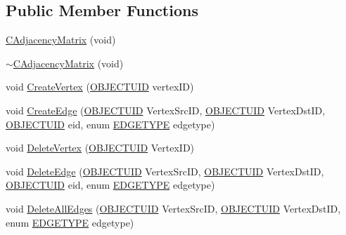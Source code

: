 \subsection*{Public Member Functions}
\begin{DoxyCompactItemize}
\item 
\hyperlink{class_n_m_1_1_o_d_b_1_1_c_adjacency_matrix_a0e8396d3b62701ef050f7b43819dc217}{C\+Adjacency\+Matrix} (void)
\item 
\hyperlink{class_n_m_1_1_o_d_b_1_1_c_adjacency_matrix_a526eb801477d33094e800614b1e4b4a3}{$\sim$\+C\+Adjacency\+Matrix} (void)
\item 
void \hyperlink{class_n_m_1_1_o_d_b_1_1_c_adjacency_matrix_aed4e1441f1acb61060b5076a766154fd}{Create\+Vertex} (\hyperlink{namespace_n_m_1_1_o_d_b_a262b64fab56baaa96e18bac4ada88265}{O\+B\+J\+E\+C\+T\+U\+I\+D} vertex\+I\+D)
\item 
void \hyperlink{class_n_m_1_1_o_d_b_1_1_c_adjacency_matrix_ada545d95afc704db45d8de771ce90f46}{Create\+Edge} (\hyperlink{namespace_n_m_1_1_o_d_b_a262b64fab56baaa96e18bac4ada88265}{O\+B\+J\+E\+C\+T\+U\+I\+D} Vertex\+Src\+I\+D, \hyperlink{namespace_n_m_1_1_o_d_b_a262b64fab56baaa96e18bac4ada88265}{O\+B\+J\+E\+C\+T\+U\+I\+D} Vertex\+Dst\+I\+D, \hyperlink{namespace_n_m_1_1_o_d_b_a262b64fab56baaa96e18bac4ada88265}{O\+B\+J\+E\+C\+T\+U\+I\+D} eid, enum \hyperlink{class_n_m_1_1_o_d_b_1_1_c_adjacency_matrix_aa4f68c561981e4e158dec4a4a9a97093}{E\+D\+G\+E\+T\+Y\+P\+E} edgetype)
\item 
void \hyperlink{class_n_m_1_1_o_d_b_1_1_c_adjacency_matrix_a3c49a3adc6a27dfbc46b6f84cb9c48a5}{Delete\+Vertex} (\hyperlink{namespace_n_m_1_1_o_d_b_a262b64fab56baaa96e18bac4ada88265}{O\+B\+J\+E\+C\+T\+U\+I\+D} Vertex\+I\+D)
\item 
void \hyperlink{class_n_m_1_1_o_d_b_1_1_c_adjacency_matrix_a41bb80d3cc1f376e496b031f1ed7762d}{Delete\+Edge} (\hyperlink{namespace_n_m_1_1_o_d_b_a262b64fab56baaa96e18bac4ada88265}{O\+B\+J\+E\+C\+T\+U\+I\+D} Vertex\+Src\+I\+D, \hyperlink{namespace_n_m_1_1_o_d_b_a262b64fab56baaa96e18bac4ada88265}{O\+B\+J\+E\+C\+T\+U\+I\+D} Vertex\+Dst\+I\+D, \hyperlink{namespace_n_m_1_1_o_d_b_a262b64fab56baaa96e18bac4ada88265}{O\+B\+J\+E\+C\+T\+U\+I\+D} eid, enum \hyperlink{class_n_m_1_1_o_d_b_1_1_c_adjacency_matrix_aa4f68c561981e4e158dec4a4a9a97093}{E\+D\+G\+E\+T\+Y\+P\+E} edgetype)
\item 
void \hyperlink{class_n_m_1_1_o_d_b_1_1_c_adjacency_matrix_aef66ef8cc6d5ad26172960bf03412e5c}{Delete\+All\+Edges} (\hyperlink{namespace_n_m_1_1_o_d_b_a262b64fab56baaa96e18bac4ada88265}{O\+B\+J\+E\+C\+T\+U\+I\+D} Vertex\+Src\+I\+D, \hyperlink{namespace_n_m_1_1_o_d_b_a262b64fab56baaa96e18bac4ada88265}{O\+B\+J\+E\+C\+T\+U\+I\+D} Vertex\+Dst\+I\+D, enum \hyperlink{class_n_m_1_1_o_d_b_1_1_c_adjacency_matrix_aa4f68c561981e4e158dec4a4a9a97093}{E\+D\+G\+E\+T\+Y\+P\+E} edgetype)

\end{DoxyCompactItemize}
